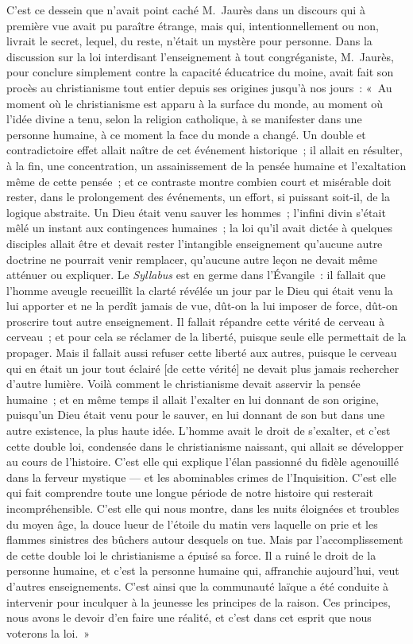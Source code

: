 \documentclass[french,twoside]{book} %
\begin{document}
C’est ce dessein que n’avait point caché M. Jaurès dans un discours qui à première vue avait pu paraître étrange, mais qui, intentionnellement ou non, livrait le secret, lequel, du reste, n’était un mystère pour personne. Dans la discussion sur la loi interdisant l’enseignement à tout congréganiste, M. Jaurès, pour conclure simplement contre la capacité éducatrice du moine, avait fait son procès au christianisme tout entier depuis ses origines jusqu’à nos jours : « Au moment où le christianisme est apparu à la surface du monde, au moment où l’idée divine a tenu, selon la religion catholique, à se manifester dans une personne humaine, à ce moment la face du monde a changé. Un double et contradictoire effet allait naître de cet événement historique ; il allait en résulter, à la fin, une concentration, un assainissement de la pensée humaine et l’exaltation même de cette pensée ; et ce contraste montre combien court et misérable doit rester, dans le prolongement des événements, un effort, si puissant soit-il, de la logique abstraite. Un Dieu était venu sauver les  hommes ; l’infini divin s’était mêlé un instant aux contingences humaines ; la loi qu’il avait dictée à quelques disciples allait être et devait rester l’intangible enseignement qu’aucune autre doctrine ne pourrait venir remplacer, qu’aucune autre leçon ne devait même atténuer ou expliquer. Le \emph{Syllabus} est en germe dans l’Évangile : il fallait que l’homme aveugle recueillît la clarté révélée un jour par le Dieu qui était venu la lui apporter et ne la perdît jamais de vue, dût-on la lui imposer de force, dût-on proscrire tout autre enseignement. Il fallait répandre cette vérité de cerveau à cerveau ; et pour cela se réclamer de la liberté, puisque seule elle permettait de la propager. Mais il fallait aussi refuser cette liberté aux autres, puisque le cerveau qui en était un jour tout éclairé [de cette vérité] ne devait plus jamais rechercher d’autre lumière. Voilà comment le christianisme devait asservir la pensée humaine ; et en même temps il allait l’exalter en lui donnant de son origine, puisqu’un Dieu était venu pour le sauver, en lui donnant de son but dans une autre existence, la plus haute idée. L’homme avait le droit de s’exalter, et c’est cette double loi, condensée dans le christianisme naissant, qui allait se développer au cours de l’histoire. C’est elle qui explique l’élan passionné du fidèle agenouillé dans la ferveur  mystique — et les abominables crimes de l’Inquisition. C’est elle qui fait comprendre toute une longue période de notre histoire qui resterait incompréhensible. C’est elle qui nous montre, dans les nuits éloignées et troubles du moyen âge, la douce lueur de l’étoile du matin vers laquelle on prie et les flammes sinistres des bûchers autour desquels on tue. Mais par l’accomplissement de cette double loi le christianisme a épuisé sa force. Il a ruiné le droit de la personne humaine, et c’est la personne humaine qui, affranchie aujourd’hui, veut d’autres enseignements. C’est ainsi que la communauté laïque a été conduite à intervenir pour inculquer à la jeunesse les principes de la raison. Ces principes, nous avons le devoir d’en faire une réalité, et c’est dans cet esprit que nous voterons la loi. »\par
\end{document}
